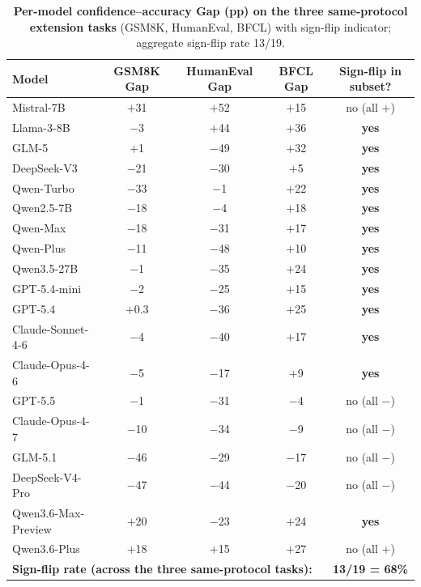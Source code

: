 \documentclass[11pt]{article}
\begin{document}
\begin{table}[h]
\centering
\small
\caption{\textbf{Per-model confidence--accuracy Gap (pp) on the three same-protocol extension tasks} (GSM8K, HumanEval, BFCL) with sign-flip indicator; aggregate sign-flip rate 13/19.}
\label{tab:signflip_data}
\begin{tabular}{l c c c c}
\toprule
\textbf{Model} & GSM8K Gap & HumanEval Gap & BFCL Gap & Sign-flip in subset? \\
\midrule
Mistral-7B        & $+$31 & $+$52 & $+$15 & no (all $+$) \\
Llama-3-8B        & $-$3  & $+$44 & $+$36 & \textbf{yes} \\
GLM-5             & $+$1  & $-$49 & $+$32 & \textbf{yes} \\
DeepSeek-V3     & $-$21 & $-$30 & $+$5  & \textbf{yes} \\
Qwen-Turbo        & $-$33 & $-$1  & $+$22 & \textbf{yes} \\
Qwen2.5-7B        & $-$18 & $-$4  & $+$18 & \textbf{yes} \\
Qwen-Max          & $-$18 & $-$31 & $+$17 & \textbf{yes} \\
Qwen-Plus         & $-$11 & $-$48 & $+$10 & \textbf{yes} \\
Qwen3.5-27B       & $-$1  & $-$35 & $+$24 & \textbf{yes} \\
GPT-5.4-mini      & $-$2  & $-$25 & $+$15 & \textbf{yes} \\
GPT-5.4           & $+$0.3 & $-$36 & $+$25 & \textbf{yes} \\
Claude-Sonnet-4-6 & $-$4  & $-$40 & $+$17 & \textbf{yes} \\
Claude-Opus-4-6   & $-$5  & $-$17 & $+$9  & \textbf{yes} \\
GPT-5.5           & $-$1  & $-$31 & $-$4  & no (all $-$) \\
Claude-Opus-4-7   & $-$10 & $-$34 & $-$9  & no (all $-$) \\
GLM-5.1           & $-$46 & $-$29 & $-$17 & no (all $-$) \\
DeepSeek-V4-Pro   & $-$47 & $-$44 & $-$20 & no (all $-$) \\
Qwen3.6-Max-Preview & $+$20 & $-$23 & $+$24 & \textbf{yes} \\
Qwen3.6-Plus      & $+$18 & $+$15 & $+$27 & no (all $+$) \\
\midrule
\multicolumn{4}{l}{\textbf{Sign-flip rate (across the three same-protocol tasks):}} & \textbf{13/19 = 68\%} \\
\bottomrule
\end{tabular}
\end{table}
\end{document}
